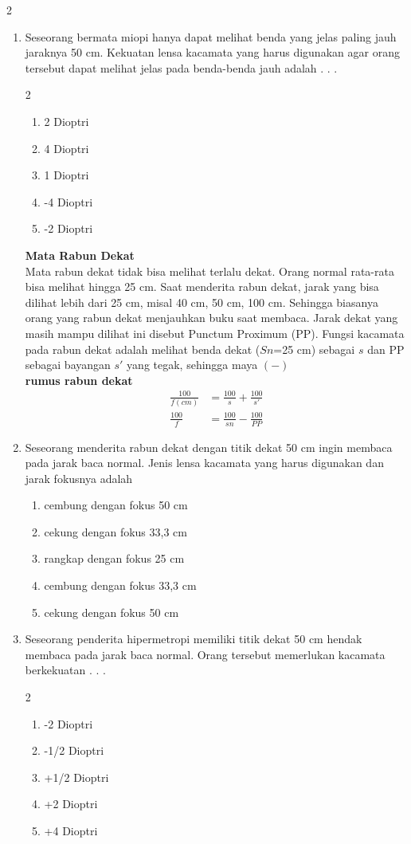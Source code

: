 \documentclass[10pt,a4paper]{extarticle}
\newcommand*\pilgan[1]{
\begin{enumerate}[label=\Alph*., itemsep=0pt,topsep=0pt,leftmargin=*,align=Center] #1 
\end{enumerate}}
\newcommand{\pilgani}[1]{                            \vspace{-0.3cm}\begin{multicols}{2}
 \begin{enumerate}[label=\Alph*., itemsep=0pt,topsep=0pt,leftmargin=*,align=Center]#1                     \end{enumerate}
 \phantom{ini cuma sapi, wedus, dan ayam}
 \end{multicols}}
\begin{document}
\begin{multicols*}{2}
\begin{enumerate}
\item Seseorang bermata miopi hanya dapat melihat benda yang jelas paling jauh jaraknya 50 cm. Kekuatan lensa kacamata yang harus digunakan agar orang tersebut dapat melihat jelas pada benda-benda jauh adalah . . .
\pilgani{
	\item 2 Dioptri
	\item 4 Dioptri
	\item 1 Dioptri
	\item -4 Dioptri
	\item -2 Dioptri }
\vspace{3cm}

\textbf{Mata Rabun Dekat}\\
Mata rabun dekat tidak bisa melihat terlalu dekat. Orang normal rata-rata bisa melihat hingga 25 cm. Saat menderita rabun dekat, jarak yang bisa dilihat lebih dari 25 cm, misal 40 cm, 50 cm, 100 cm. Sehingga biasanya orang yang rabun dekat menjauhkan buku saat membaca. Jarak dekat yang masih mampu dilihat ini disebut Punctum Proximum (PP). Fungsi kacamata pada rabun dekat adalah melihat benda dekat ($Sn$=25 cm) sebagai $s$ dan PP sebagai bayangan $s'$ yang tegak, sehingga maya $(-)$\\
\vspace{1cm}
\textbf{rumus rabun dekat}
\vspace{-0.7cm}
\begin{align*}
\frac{100}{f(cm)} &= \frac{100}{s}+\frac{100}{s'}\\
\frac{100}{f} &= \frac{100}{sn} - \frac{100}{PP}
\end{align*}

\item Seseorang menderita rabun dekat dengan titik dekat 50 cm ingin membaca pada jarak baca normal. Jenis lensa kacamata yang harus digunakan dan jarak fokusnya adalah 
\pilgan{
	\item cembung dengan fokus 50 cm
	\item cekung dengan fokus 33,3 cm
	\item rangkap dengan fokus 25 cm
	\item cembung dengan fokus 33,3 cm
	\item cekung dengan fokus 50 cm }
\vspace{2cm}

\item Seseorang penderita hipermetropi memiliki titik dekat 50 cm hendak membaca pada jarak baca normal. Orang tersebut memerlukan kacamata berkekuatan . . . 
\pilgani{
	\item -2 Dioptri
	\item -1/2 Dioptri
	\item +1/2 Dioptri
	\item +2 Dioptri
	\item +4 Dioptri }
\vspace{2cm}



\end{enumerate}
\end{multicols*}
\end{document}
